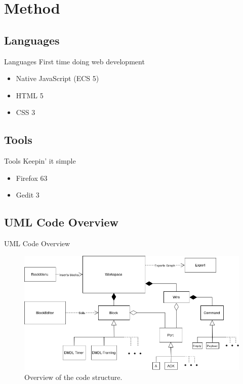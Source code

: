 \documentclass{beamer}
\begin{document}
\section{Method}

\subsection{Languages}
\begin{frame}{Languages}
	First time doing web development
	\begin{itemize}
		\item<2-> Native JavaScript (ECS 5)
		\item<3-> HTML 5
		\item<4-> CSS 3
	\end{itemize}
\end{frame}

\subsection{Tools}
\begin{frame}{Tools}
	Keepin' it simple
	\begin{itemize}
		\item<2-> Firefox 63
		\item<3-> Gedit 3
	\end{itemize}
\end{frame}

\subsection{UML Code Overview}
\begin{frame}{UML Code Overview}
\centering
	\begin{figure}
 		\includegraphics[width=\linewidth]{dmdl-editor.png}
		\caption{Overview of the code structure.}
		\label{fig:uml}
	\end{figure}
\end{frame}
\end{document}
